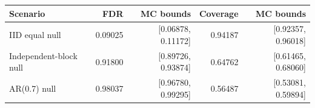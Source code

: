 \begin{tabular}{lrrrr}
\toprule
Scenario & FDR & MC bounds & Coverage & MC bounds \\
\midrule
IID equal null & 0.09025 & [0.06878, 0.11172] & 0.94187 & [0.92357, 0.96018] \\
Independent-block null & 0.91800 & [0.89726, 0.93874] & 0.64762 & [0.61465, 0.68060] \\
AR(0.7) null & 0.98037 & [0.96780, 0.99295] & 0.56487 & [0.53081, 0.59894] \\
\bottomrule
\end{tabular}
